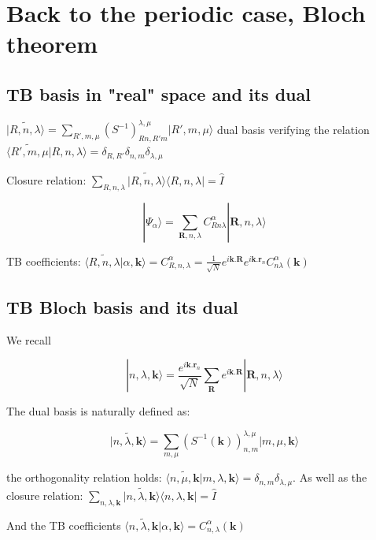 \documentclass{article}
\newcommand{\bra}[1]{\langle #1|}
\newcommand{\ket}[1]{|#1\rangle}
\newcommand{\op}[1]{\hat{#1}}
\begin{document}
\section{Back to the periodic case, Bloch theorem}

\subsection{TB basis in "real" space and its dual}

\noindent
$\displaystyle \widetilde{\ket{R,n,\lambda}} =\sum_{R',m,\mu} 
(S^{-1})_{Rn,R'm}^{\lambda, \mu} \ket{R',m,\mu}$ dual basis
verifying the relation $ 
\widetilde{\bra{R',m,\mu}}R,n,\lambda\rangle=\delta_{R,R'}\delta_{n,m}\delta_{\lambda,\mu}$ 


\noindent
Closure relation: $\displaystyle \sum_{R,n,\lambda} 
\widetilde{\ket{R,n,\lambda}}\bra{R,n,\lambda}=\op{I}$

\[\displaystyle \ket{\Psi_{\alpha}}=\sum_{\mathbf{R},n,\lambda} C_{R n  \lambda}^{\alpha} \ket{\mathbf{R},n,\lambda }\]

\noindent
TB coefficients: $\langle \widetilde{R,n,\lambda}|\alpha, 
\mathbf{k} \rangle= C_{R,n,\lambda}^{\alpha}=\frac{1}{\sqrt{N}}e^{i  \mathbf{k}.\mathbf{R}}e^{i \mathbf{k}.\mathbf{r}_n} C_{n \lambda}^{\alpha}(\mathbf{k})$


\subsection{TB Bloch basis and its dual}

\noindent
We recall

\[\ket{n,\lambda,\mathbf{k}}=\frac{e^{i \mathbf{k}.\mathbf{r}_n}}{\sqrt{N}} \sum_{\mathbf{R}} e^{i \mathbf{k}.\mathbf{R}} \ket{\mathbf{R},n,\lambda }\]

\noindent
The dual basis is naturally defined as:

\[\displaystyle \widetilde{\ket{n,\lambda, \mathbf{k}}} =\sum_{m,\mu} 
(S^{-1}(\mathbf{k}))_{n,m}^{\lambda, \mu} \ket{m,\mu,\mathbf{k}}\]

\noindent the orthogonality relation holds: $\langle \widetilde{n,\mu, \mathbf{k}}|m,\lambda,\mathbf{k}\rangle=\delta_{n,m}\delta_{\lambda,\mu}$.
\noindent
As well as the closure relation:
$\displaystyle \sum_{n,\lambda,\mathbf{k} } 
\widetilde{\ket{n,\lambda,\mathbf{k}}} \bra{n,\lambda,\mathbf{k}}=\op{I}$

\noindent
And the TB coefficients $\langle 
\widetilde{n,\lambda,\mathbf{k}}|\alpha, \mathbf{k} \rangle= 
C_{n,\lambda}^{\alpha}(\mathbf{k})$
\end{document}
